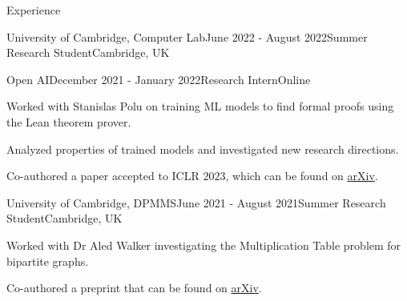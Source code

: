 \documentclass{resume} %
\begin{document}
\begin{rSection}{Experience}
\begin{rSubsection}{University of Cambridge, Computer Lab}{June 2022 - August 2022}{Summer Research Student}{Cambridge, UK}
\end{rSubsection}

\begin{rSubsection}{Open AI}{December 2021 - January 2022}{Research Intern}{Online}
\item Worked with Stanislas Polu on training ML models to find formal proofs using the Lean theorem prover.
\item Analyzed properties of trained models and investigated new research directions.
\item Co-authored a paper accepted to ICLR $2023$, which can be found on \href{https://arxiv.org/abs/2202.01344}{arXiv}.
\end{rSubsection}



\begin{rSubsection}{University of Cambridge, DPMMS}{June 2021 - August 2021}{Summer Research Student}{Cambridge, UK}
\item Worked with Dr Aled Walker investigating  the Multiplication Table problem for bipartite graphs.
\item Co-authored a preprint that can be found on \href{https://arxiv.org/abs/2109.08485}{arXiv}.
\end{rSubsection}



\end{rSection}
\end{document}
